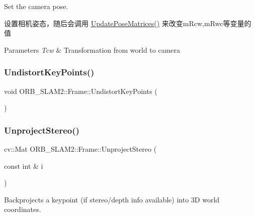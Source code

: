 Set the camera pose. 

设置相机姿态，随后会调用 \mbox{\hyperlink{class_o_r_b___s_l_a_m2_1_1_frame_a0a18d3024a23f6fa2cab9c7d987598c2}{Update\+Pose\+Matrices()}} 来改变m\+Rcw,m\+Rwc等变量的值 
\begin{DoxyParams}{Parameters}
{\em Tcw} & Transformation from world to camera \\
\hline
\end{DoxyParams}
\mbox{\label{class_o_r_b___s_l_a_m2_1_1_frame_a2a97fc690d8c1cd5e975d19440a31657}} 
\subsubsection{\texorpdfstring{Undistort\+Key\+Points()}{UndistortKeyPoints()}}
{\footnotesize\ttfamily void O\+R\+B\+\_\+\+S\+L\+A\+M2\+::\+Frame\+::\+Undistort\+Key\+Points (\begin{DoxyParamCaption}{ }\end{DoxyParamCaption})\hspace{0.3cm}{\ttfamily [private]}}

\mbox{\label{class_o_r_b___s_l_a_m2_1_1_frame_a46084d187e1fc60181e1c72f77c733ca}} 
\subsubsection{\texorpdfstring{Unproject\+Stereo()}{UnprojectStereo()}}
{\footnotesize\ttfamily cv\+::\+Mat O\+R\+B\+\_\+\+S\+L\+A\+M2\+::\+Frame\+::\+Unproject\+Stereo (\begin{DoxyParamCaption}\item[{const int \&}]{i }\end{DoxyParamCaption})}



Backprojects a keypoint (if stereo/depth info available) into 3D world coordinates. 


